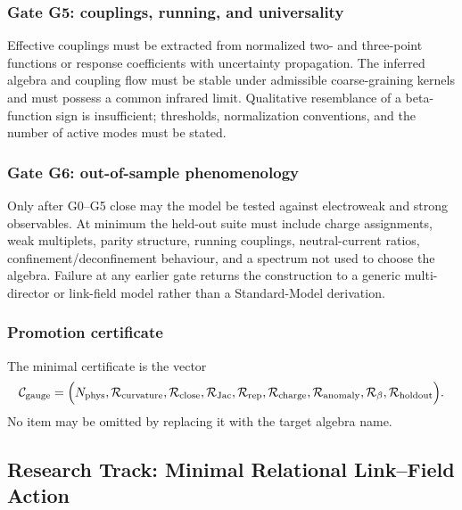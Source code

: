 \subsubsection{Gate G5: couplings, running, and universality}

Effective couplings must be extracted from normalized two- and three-point
functions or response coefficients with uncertainty propagation.  The inferred
algebra and coupling flow must be stable under admissible coarse-graining
kernels and must possess a common infrared limit.  Qualitative resemblance of
a beta-function sign is insufficient; thresholds, normalization conventions,
and the number of active modes must be stated.

\subsubsection{Gate G6: out-of-sample phenomenology}

Only after G0--G5 close may the model be tested against electroweak and strong
observables.  At minimum the held-out suite must include charge assignments,
weak multiplets, parity structure, running couplings, neutral-current ratios,
confinement/deconfinement behaviour, and a spectrum not used to choose the
algebra.  Failure at any earlier gate returns the construction to a generic
multi-director or link-field model rather than a Standard-Model derivation.

\subsubsection{Promotion certificate}

The minimal certificate is the vector
\begin{align}
    \mathcal C_{\rm gauge}
    =
    \Bigl(
        N_{\rm phys},
        \mathcal R_{\rm curvature},
        \mathcal R_{\rm close},
        \mathcal R_{\rm Jac},
        \mathcal R_{\rm rep},
        \mathcal R_{\rm charge},
        \mathcal R_{\rm anomaly},
        \mathcal R_{\beta},
        \mathcal R_{\rm holdout}
    \Bigr).
    \label{eq:rt_gauge_promotion_certificate}
\end{align}
No item may be omitted by replacing it with the target algebra name.

\subsection{Research Track: Minimal Relational Link--Field Action}
\label{sec:rt_minimal_link_field_action}

